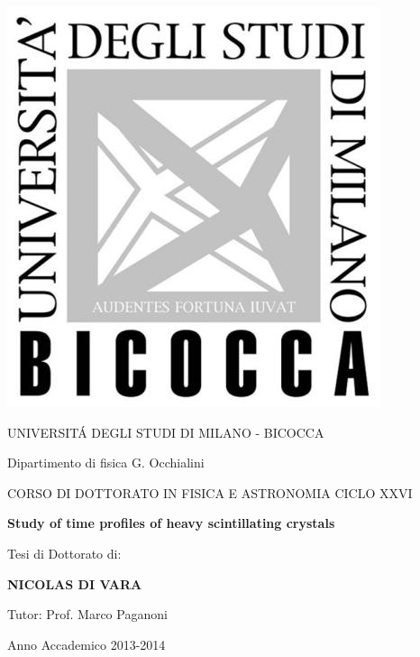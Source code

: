\documentclass[11pt, oneside]{book}
\begin{document}
 
\thispagestyle{empty}
\begin{center}
\begin{minipage}{1.\linewidth}
    \centering
    \includegraphics[width=0.3\linewidth]{logo.png}\par
    \vspace{2cm}
   
    {{\Large UNIVERSIT\' A DEGLI STUDI DI MILANO - BICOCCA\par}}
   
    {{\Large Dipartimento di fisica G. Occhialini\par}}

    \vspace{1cm}

	{{\Large CORSO DI DOTTORATO IN FISICA E ASTRONOMIA CICLO XXVI \par}}

    \vspace{1cm}

    {{\Large \textbf{Study of time profiles of heavy scintillating crystals}\par}}
    \vspace{1cm}
    {{\Large Tesi di Dottorato di:\par}}
    {\Large \textbf {NICOLAS DI VARA}\par}
    \vspace{1cm}
    {\Large Tutor: Prof. Marco Paganoni\par}
    \vspace{1cm}
    {\Large Anno Accademico 2013-2014}
\end{minipage}
\end{center}
\clearpage
\newpage
\end{document}
